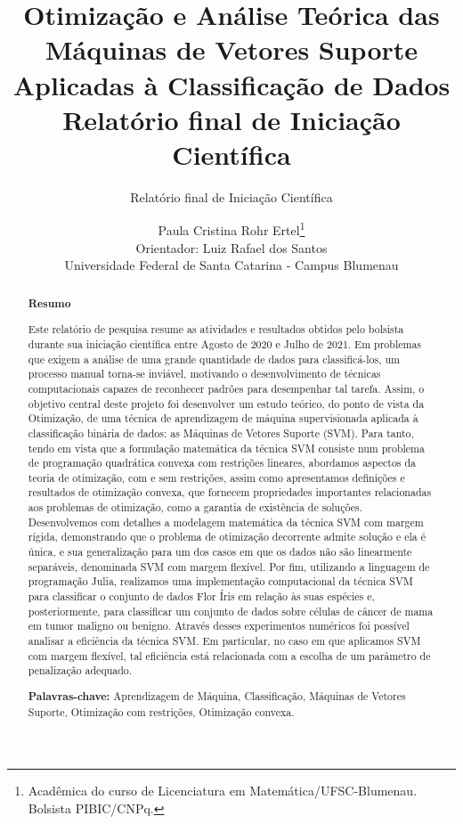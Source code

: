 \documentclass[12pt,a4paper]{scrartcl}
\theoremstyle{definition}%
\begin{document}
\title{Otimização e Análise Teórica das Máquinas de Vetores Suporte Aplicadas à Classificação de Dados\\ {\small Relatório final de Iniciação Científica}} 
\author{ \normalfont Paula Cristina Rohr Ertel\thanks{Acadêmica do curso de Licenciatura em Matemática/UFSC-Blumenau. Bolsista PIBIC/CNPq.} \\ \small Orientador: Luiz Rafael dos Santos \\ \small Universidade Federal de Santa Catarina - Campus Blumenau}
\subtitle{Relatório final de Iniciação Científica}
\maketitle

\begin{abstract}

\begin{center}
\textbf{Resumo}
\end{center}

Este relatório de pesquisa resume as atividades e resultados obtidos pelo bolsista durante sua iniciação científica entre Agosto de 2020 e Julho de 2021.
Em problemas que exigem a análise de uma grande quantidade de dados para classificá-los, um processo manual torna-se inviável, motivando o desenvolvimento de técnicas computacionais capazes de reconhecer padrões para desempenhar tal tarefa. Assim, o objetivo central deste projeto foi desenvolver um estudo teórico, do ponto de vista da Otimização, de uma técnica de aprendizagem de máquina supervisionada aplicada à classificação binária de dados: as Máquinas de Vetores Suporte (SVM). Para tanto, tendo em vista que a formulação matemática da técnica SVM consiste num problema de programação quadrática convexa com restrições lineares, abordamos aspectos da teoria de otimização, com e sem restrições, assim como apresentamos definições e resultados de otimização convexa, que fornecem propriedades importantes relacionadas aos problemas de otimização, como a garantia de existência de soluções. Desenvolvemos com detalhes a modelagem matemática da técnica SVM com margem rígida, demonstrando que o problema de otimização decorrente admite solução e ela é única, e sua generalização para um dos casos em que os dados não são linearmente separáveis, denominada SVM com margem flexível. Por fim, utilizando a linguagem de programação Julia, realizamos uma implementação computacional da técnica SVM para classificar o conjunto de dados Flor Íris em relação às suas espécies e, posteriormente, para classificar um conjunto de dados sobre células de câncer de mama em tumor maligno ou benigno. Através desses experimentos numéricos foi possível analisar a eficiência da técnica SVM. Em particular, no caso em que aplicamos SVM com margem flexível, tal eficiência está relacionada com a escolha de um parâmetro de penalização adequado.

\textbf{Palavras-chave:} Aprendizagem de Máquina, Classificação, Máquinas de Vetores Suporte, Otimização com restrições, Otimização convexa.
\end{abstract}
\end{document}
